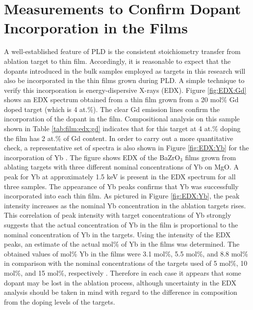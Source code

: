 \vspace{12pt}
\section{Measurements to Confirm Dopant Incorporation in the Films}
A well-established feature of PLD is the consistent stoichiometry transfer from ablation target to thin film. Accordingly, it is reasonable to expect that the dopants introduced in the bulk samples employed as targets in this research will also be incorporated in the thin films grown during PLD. A simple technique to verify this incorporation is energy-dispersive X-rays (EDX). Figure \ref{fig:EDX:Gd} shows an EDX spectrum obtained from a thin film grown from a 20 mol\% Gd doped target (which is 4 at.\%). The clear Gd emission lines confirm the incorporation of the dopant in the film. Compositional analysis on this sample shown in Table \ref{tab:film:edx:gd} indicates that for this target at 4 at.\% doping the film has 2 at.\% of Gd content. In order to carry out a more quantitative check, a representative set of spectra is also shown in Figure \ref{fig:EDX:Yb} for the incorporation of Yb \cite{ECamata2012}. The figure shows EDX of the BaZrO$_3$ films grown from ablating targets with three different nominal concentrations of Yb on MgO. A peak for Yb at approximately 1.5 keV is present in the EDX spectrum for all three samples. The appearance of Yb peaks confirms that Yb was successfully incorporated into each thin film. As pictured in Figure \ref{fig:EDX:Yb}, the peak intensity increases as the nominal Yb concentration in the ablation targets rises. This correlation of peak intensity with target concentrations of Yb strongly suggests that the actual concentration of Yb in the film is proportional to the nominal concentration of Yb in the targets. Using the intensity of the EDX peaks, an estimate of the actual mol\% of Yb in the films was determined. The obtained values of mol\% Yb in the films were 3.1 mol\%, 5.5 mol\%, and 8.8 mol\% in comparison with the nominal concentrations of the targets used of 5 mol\%, 10 mol\%, and 15 mol\%, respectively \cite{ECamata2012}. Therefore in each case it appears that some dopant may be lost in the ablation process, although uncertainty in the EDX analysis should be taken in mind with regard to the difference in composition from the doping levels of the targets. 
